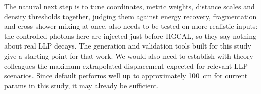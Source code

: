 The natural next step is to tune coordinates, metric weights, distance scales
and density thresholds together, judging them against energy recovery,
fragmentation and cross-shower mixing at once. \cluestering{} also needs to be tested on more
realistic inputs: the controlled photons here are injected just before HGCAL,
so they say nothing about real LLP decays. The
generation and validation tools built for this study give a starting point for
that work. We would also need to establish with theory colleagues the
maximum extrapolated displacement expected for relevant LLP scenarios. Since
default \cluethreed{} performs well up to approximately \SI{100}{cm} for current params in this
study, it may already be sufficient.
